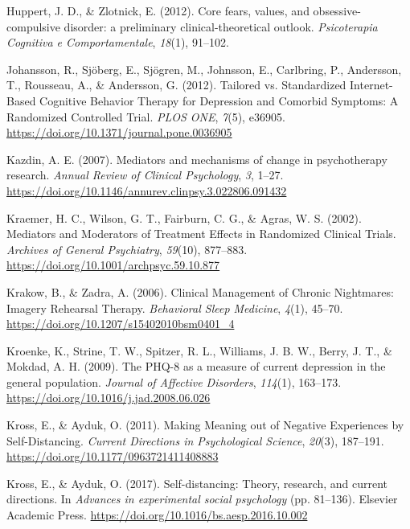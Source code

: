\documentclass[
  man,floatsintext]{apa7}
\newlength{\cslhangindent}
\newlength{\cslentryspacingunit} %
\newenvironment{CSLReferences}[2] %
 {%
  \setlength{\parindent}{0pt}
  \ifodd #1
  \let\oldpar\par
  \def\par{\hangindent=\cslhangindent\oldpar}
  \fi
  \setlength{\parskip}{#2\cslentryspacingunit}
 }%
 {}
\begin{document}
\begin{CSLReferences}{1}{0}
\leavevmode{}%
Huppert, J. D., \& Zlotnick, E. (2012). Core fears, values, and obsessive-compulsive disorder: a preliminary clinical-theoretical outlook. \emph{Psicoterapia Cognitiva e Comportamentale}, \emph{18}(1), 91--102.

\leavevmode{}%
Johansson, R., Sjöberg, E., Sjögren, M., Johnsson, E., Carlbring, P., Andersson, T., Rousseau, A., \& Andersson, G. (2012). Tailored vs. Standardized Internet-Based Cognitive Behavior Therapy for Depression and Comorbid Symptoms: A Randomized Controlled Trial. \emph{PLOS ONE}, \emph{7}(5), e36905. \url{https://doi.org/10.1371/journal.pone.0036905}

\leavevmode{}%
Kazdin, A. E. (2007). Mediators and mechanisms of change in psychotherapy research. \emph{Annual Review of Clinical Psychology}, \emph{3}, 1--27. \url{https://doi.org/10.1146/annurev.clinpsy.3.022806.091432}

\leavevmode{}%
Kraemer, H. C., Wilson, G. T., Fairburn, C. G., \& Agras, W. S. (2002). Mediators and Moderators of Treatment Effects in Randomized Clinical Trials. \emph{Archives of General Psychiatry}, \emph{59}(10), 877--883. \url{https://doi.org/10.1001/archpsyc.59.10.877}

\leavevmode{}%
Krakow, B., \& Zadra, A. (2006). Clinical Management of Chronic Nightmares: Imagery Rehearsal Therapy. \emph{Behavioral Sleep Medicine}, \emph{4}(1), 45--70. \url{https://doi.org/10.1207/s15402010bsm0401_4}

\leavevmode{}%
Kroenke, K., Strine, T. W., Spitzer, R. L., Williams, J. B. W., Berry, J. T., \& Mokdad, A. H. (2009). The PHQ-8 as a measure of current depression in the general population. \emph{Journal of Affective Disorders}, \emph{114}(1), 163--173. \url{https://doi.org/10.1016/j.jad.2008.06.026}

\leavevmode{}%
Kross, E., \& Ayduk, O. (2011). Making Meaning out of Negative Experiences by Self-Distancing. \emph{Current Directions in Psychological Science}, \emph{20}(3), 187--191. \url{https://doi.org/10.1177/0963721411408883}

\leavevmode{}%
Kross, E., \& Ayduk, O. (2017). Self-distancing: Theory, research, and current directions. In \emph{Advances in experimental social psychology} (pp. 81--136). Elsevier Academic Press. \url{https://doi.org/10.1016/bs.aesp.2016.10.002}


\end{CSLReferences}
\end{document}
